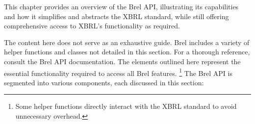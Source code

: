 This chapter provides an overview of the Brel API, 
illustrating its capabilities and how it simplifies and abstracts the XBRL standard, 
while still offering comprehensive access to XBRL's functionality as required.

The content here does not serve as an exhaustive guide. 
Brel includes a variety of helper functions and classes not detailed in this section. 
For a thorough reference, consult the Brel API documentation\cite{brel_api}. 
The elements outlined here represent the essential functionality required to access all Brel features.
\footnote{Some helper functions directly interact with the XBRL standard to avoid unnecessary overhead.}
The Brel API is segmented into various components, each discussed in this section:

